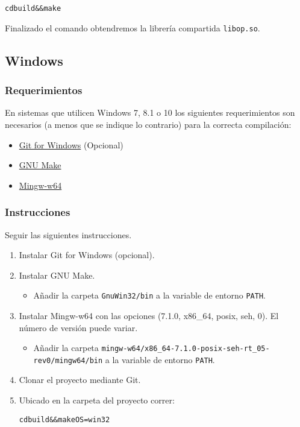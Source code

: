 \documentclass[12pt,a4paper,final]{article}
\begin{document}
			\begin{alltt}
				cd build && make
			\end{alltt}

			Finalizado el comando obtendremos la librería compartida \texttt{libop.so}.

	\subsection{Windows}
		\subsubsection{Requerimientos}
			En sistemas que utilicen Windows 7, 8.1 o 10 los siguientes requerimientos
			son necesarios (a menos que se indique lo contrario) para la correcta compilación:
			\begin{itemize}
				\item \href{https://git-scm.com/download/win}{Git for Windows} (Opcional)
				\item \href{http://gnuwin32.sourceforge.net/packages/make.htm}{GNU Make}
				\item \href{https://sourceforge.net/projects/mingw-w64/}{Mingw-w64}
			\end{itemize}
		\subsubsection{Instrucciones}
			Seguir las siguientes instrucciones.
			
			\begin{enumerate}
				\item Instalar Git for Windows (opcional).
				\item Instalar GNU Make.
					\begin{itemize}
						\item Añadir la carpeta \texttt{GnuWin32/bin} a la variable de entorno \texttt{PATH}.
					\end{itemize}
				\item Instalar Mingw-w64 con las opciones (7.1.0, x86\_64, posix, seh, 0). El número de versión puede variar.
					\begin{itemize}
						\item Añadir la carpeta \texttt{mingw-w64/x86\_64-7.1.0-posix-seh-rt\_05-rev0/mingw64/bin} a la variable de entorno \texttt{PATH}.
					\end{itemize}
				\item Clonar el proyecto mediante Git.
				\item Ubicado en la carpeta del proyecto correr: 
						\begin{alltt}
							cd build \&\& make OS=win32
						\end{alltt}			
			\end{enumerate}
		
\end{document}
